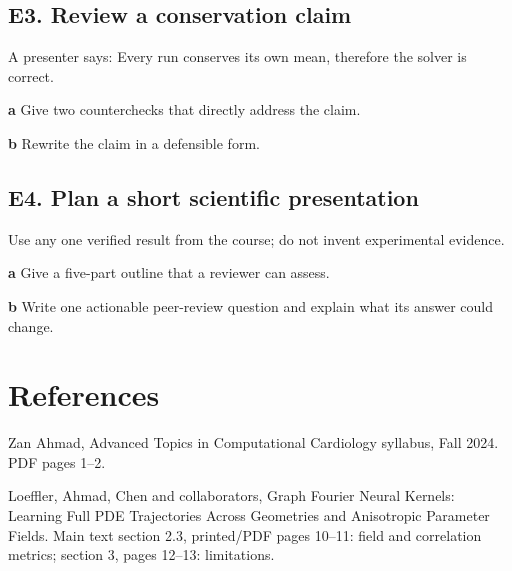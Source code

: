 \documentclass[11pt,letterpaper]{article}
\theoremstyle{definition}\newtheorem{definition}{Definition}\newtheorem{example}{Example}
\numberwithin{equation}{section}
\begin{document}
\par\noindent\begin{minipage}{\linewidth}
\subsection*{E3. Review a conservation claim}
A presenter says: Every run conserves its own mean, therefore the solver is correct.

\textbf{a} Give two counterchecks that directly address the claim.

\end{minipage}\par\medskip
\textbf{b} Rewrite the claim in a defensible form.

\par\noindent\begin{minipage}{\linewidth}
\subsection*{E4. Plan a short scientific presentation}
Use any one verified result from the course; do not invent experimental evidence.

\textbf{a} Give a five-part outline that a reviewer can assess.

\end{minipage}\par\medskip
\textbf{b} Write one actionable peer-review question and explain what its answer could change.

\section*{References}
\noindent\begin{minipage}{\linewidth}
Zan Ahmad, Advanced Topics in Computational Cardiology syllabus, Fall 2024. PDF pages 1--2.

\end{minipage}\par\medskip
\noindent\begin{minipage}{\linewidth}
Loeffler, Ahmad, Chen and collaborators, Graph Fourier Neural Kernels: Learning Full PDE Trajectories Across Geometries and Anisotropic Parameter Fields. Main text section 2.3, printed/PDF pages 10--11: field and correlation metrics; section 3, pages 12--13: limitations.

\end{minipage}\par\medskip
\end{document}
